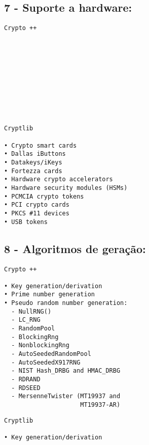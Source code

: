 \documentclass[
    article,            %
    11pt,               %
    oneside,            %
    a4paper,            %
    english,            %
    brazil,             %
    sumario=tradicional,
    ]{abntex2}
\begin{document}
\subsection*{\textbf{7 - Suporte a hardware:}}

\par\noindent
\begin{minipage}[t]{.49\textwidth}
\begin{Verbatim}[frame=single]
             Crypto ++











\end{Verbatim}
\end{minipage}
\hfill
\begin{minipage}[t]{.49\textwidth}
\begin{Verbatim}[frame=single]
             Cryptlib

• Crypto smart cards
• Dallas iButtons
• Datakeys/iKeys
• Fortezza cards
• Hardware crypto accelerators
• Hardware security modules (HSMs)
• PCMCIA crypto tokens
• PCI crypto cards
• PKCS #11 devices
• USB tokens
\end{Verbatim}
\end{minipage}


\subsection*{\textbf{8 - Algoritmos de geração:}}

\par\noindent
\begin{minipage}[t]{.49\textwidth}
\begin{Verbatim}[frame=single]
             Crypto ++

• Key generation/derivation
• Prime number generation
• Pseudo random number generation:
  - NullRNG()
  - LC_RNG
  - RandomPool
  - BlockingRng
  - NonblockingRng
  - AutoSeededRandomPool
  - AutoSeededX917RNG
  - NIST Hash_DRBG and HMAC_DRBG
  - RDRAND
  - RDSEED
  - MersenneTwister (MT19937 and
                     MT19937-AR)
\end{Verbatim}
\end{minipage}
\hfill
\begin{minipage}[t]{.49\textwidth}
\begin{Verbatim}[frame=single]
             Cryptlib

• Key generation/derivation














\end{Verbatim}
\end{minipage}
\end{document}
